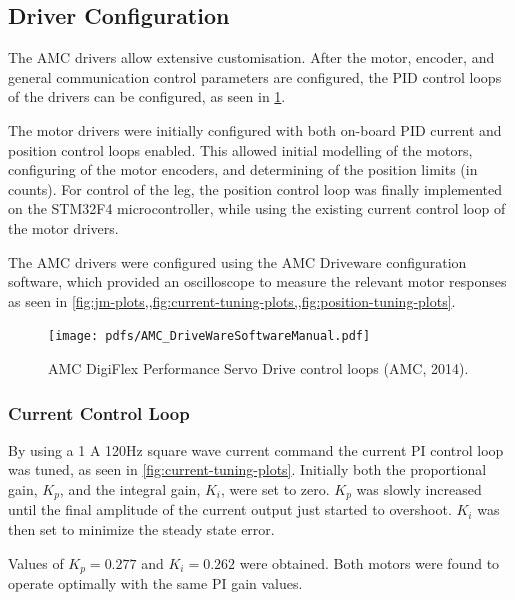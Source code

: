 \subsection{Driver Configuration}

The AMC drivers allow extensive customisation. After the motor, encoder, and general communication control parameters are configured, the PID control loops of the drivers can be configured, as seen in \cref{fig:AMCControlLoops}.

The motor drivers were initially configured with both on-board PID current and position control loops enabled. This allowed initial modelling of the motors, configuring of the motor encoders, and determining of the position limits (in counts). For control of the leg, the position control loop was finally implemented on the STM32F4 microcontroller, while using the existing current control loop of the motor drivers.

The AMC drivers were configured using the AMC Driveware configuration software, which provided an oscilloscope to measure the relevant motor responses as seen in \cref{fig:jm-plots,,fig:current-tuning-plots,,fig:position-tuning-plots}.

\begin{figure}
\centering
\texttt{[image: pdfs/AMC\_DriveWareSoftwareManual.pdf]} 
\caption{AMC DigiFlex Performance Servo Drive control loops (AMC, 2014).}
\label{fig:AMCControlLoops}
\end{figure}

\subsubsection{Current Control Loop}

By using a 1 A 120Hz square wave current command the current PI control loop was tuned, as seen in \cref{fig:current-tuning-plots}. Initially both  the proportional gain, $K_p$, and the integral gain, $K_i$, were set to zero. $K_p$ was slowly increased until the final amplitude of the current output just started to overshoot. $K_i$ was then set to minimize the steady state error. 

Values of $K_p = 0.277$ and $K_i = 0.262$ were obtained. Both motors were found to operate optimally with the same PI gain values.

